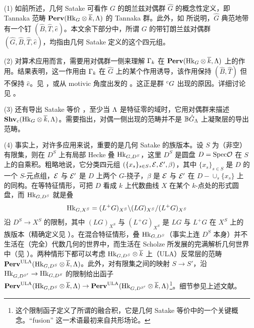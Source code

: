 \begin{rmk}
\label{R: birth of the dual group}
(1) 如前所述，几何 Satake 可看作 $G$ 的朗兰兹对偶群 $\hat G$ 的概念性定义，即 Tannaka 范畴 ${\mathbf{Perv}}({\operatorname{Hk}}_G\otimes \overline k,{\Lambda})$ 的 Tannaka 群。此外，如 \cite{Yun-Zhu-Integral-Homology, Zhu-Ramified-Sat} 所说明，$\hat G$ 典范地带有一个钉 $(\hat B, \hat T, \hat e)$。本文余下部分中，所谓 $G$ 的带钉朗兰兹对偶群 $(\hat{G},\hat{B},\hat{T},\hat{e})$，均指由几何 Satake 定义的这个四元组。

(2) 对算术应用而言，需要用对偶群一侧来理解 ${\Gamma}_k$ 在 ${\mathbf{Perv}}({\operatorname{Hk}}_G\otimes\overline k,{\Lambda})$ 上的作用。结果表明，这一作用由 ${\Gamma}_k$ 在 $\hat{G}$ 上的某个作用诱导，该作用保持 $(\hat{B},\hat{T})$ 但不保持 $\hat{e}$。见 \cite{Zhu-Ramified-Sat, Zhu-PCMI}，或从 motivic 角度出发的 \cite{Zhu-CDM}。这正是群 ${}^cG$ 出现的原因。详细讨论见 \cite{Zhu-Ramified-Sat, Zhu-PCMI, Zhu-Integral-Satake}。

(3) 还有导出 Satake 等价 \cite{Bezrukavnikov-Finkelberg-Derived-Satake}，至少当 ${\Lambda}$ 是特征零的域时，它用对偶群来描述 ${\mathbf{Shv}}_{c}({\operatorname{Hk}}_G\otimes\overline k,{\Lambda})$。需要指出，对偶一侧出现的范畴并不是 ${\mathbb B}\hat{G}_{\Lambda}$ 上凝聚层的导出范畴。

(4) 事实上，对许多应用来说，重要的是几何 Satake 的族版本。设 $S$ 为（非空）有限集，则在 $D^S$ 上有局部 Hecke 叠 ${\operatorname{Hk}}_{G,D^S}$，这里 $D^S$ 是圆盘 $D={\operatorname{Spec}} {\mathcal O}$ 在 $S$ 上的自乘积。粗略地说，它分类四元组 $(\{x_s\}_{s\in S}, {\mathcal E},{\mathcal E}',\beta)$，其中 $\{x_s\}_{s\in S}$ 是 $D$ 的一个 $S$-元点组，${\mathcal E}$ 与 ${\mathcal E}'$ 是 $D$ 上两个 $G$-挠子，$\beta$ 是 ${\mathcal E}$ 与 ${\mathcal E}'$ 在 $D-\cup_{s} \{x_s\}$ 上的同构。在等特征情形，可把 $D$ 看成 $k$ 上代数曲线 $X$ 在某个 $k$-点处的形式圆盘，而 ${\operatorname{Hk}}_{G,D^S}$ 就是叠
\[
{\operatorname{Hk}}_{G, X^S}=(L^+G)_{X^S}\backslash (LG)_{X^S}/(L^+G)_{X^S}
\]
沿 $D^S\to X^S$ 的限制，其中 $(LG)_{X^S}$ 与 $(L^+G)_{X^S}$ 是 $LG$ 与 $L^+G$ 在 $X^S$ 上的族版本（精确定义见 \cite[Sect.~3.1]{Zhu-PCMI}）。在混合特征情形，叠 ${\operatorname{Hk}}_{G,D^S}$（事实上连 $D^S$ 本身）并不生活在（完全）代数几何的世界中，而生活在 Scholze 所发展的完满解析几何世界中（见 \cite{Scholze-Berkeley, Fargues-Scholze-Geometrization}）。两种情形下都可以考虑 ${\operatorname{Hk}}_{G,D^S}\otimes\overline k$ 上（ULA）反常层的范畴 ${\mathbf{Perv}}^{\operatorname{ULA}}({\operatorname{Hk}}_{G,D^S}\otimes\overline k,{\Lambda})$。此外，对有限集之间的映射 $S\to S'$，沿 ${\operatorname{Hk}}_{G,D^{S'}}\to{\operatorname{Hk}}_{G,D^S}$ 的限制给出函子
${\mathbf{Perv}}^{\operatorname{ULA}}({\operatorname{Hk}}_{G,D^S}\otimes\overline k,{\Lambda})\to {\mathbf{Perv}}^{\operatorname{ULA}}({\operatorname{Hk}}_{G,D^{S'}}\otimes\overline k,{\Lambda})$\footnote{这个限制函子定义了所谓的融合积，它是几何 Satake 等价中的一个关键概念。``fusion'' 这一术语最初来自共形场论。}。细节参见上述文献。


\end{rmk}
